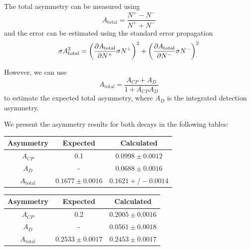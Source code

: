 \documentclass{article}
\begin{document}
    The total asymmetry can be measured using
    \begin{equation}
        A_{\text{total}} = \frac{N^+ - N^-}{N^+ + N^-}
    \end{equation}
    and the error can be estimated using the standard error propagation
    \begin{equation}
        \sigma A_{\text{total}} ^2 = \left(\pdv{A_{\text{total}}}{N^+}\sigma N^+\right)^2 + \left(\pdv{A_{\text{total}}}{N^-}\sigma N^-\right)^2
    \end{equation}

    However, we can use 
    \begin{equation}
        A_{\text{total}} = \frac{A_{CP} + A_D}{1 + A_{CP}A_D}
    \end{equation}
    to estimate the expected total asymmetry, where $A_{D}$ is the integrated detection asymmetry.

    We present the asymmetry results for both decays in the following tables:
    \begin{center}
        \begin{tabular}{c|c|c}
            Asymmetry & Expected & Calculated\\
            \hline\hline
            $A_{CP}$ & 0.1 & $0.0998\pm0.0012$\\
            $A_{D}$ & - & $0.0688\pm0.0016$\\
            $A_{\text{total}}$ & $0.1677\pm0.0016$ & $0.1621 +/- 0.0014$\\
        \end{tabular}
    \end{center}

    \begin{center}
        \begin{tabular}{c|c|c}
            Asymmetry & Expected & Calculated\\
            \hline\hline
            $A_{CP}$ & 0.2 & $0.2005\pm0.0016$\\
            $A_{D}$ & - & $0.0561\pm0.0018$\\
            $A_{\text{total}}$ & $0.2533\pm0.0017$ & $0.2453\pm0.0017$\\
        \end{tabular}
    \end{center}
    
\end{document}

